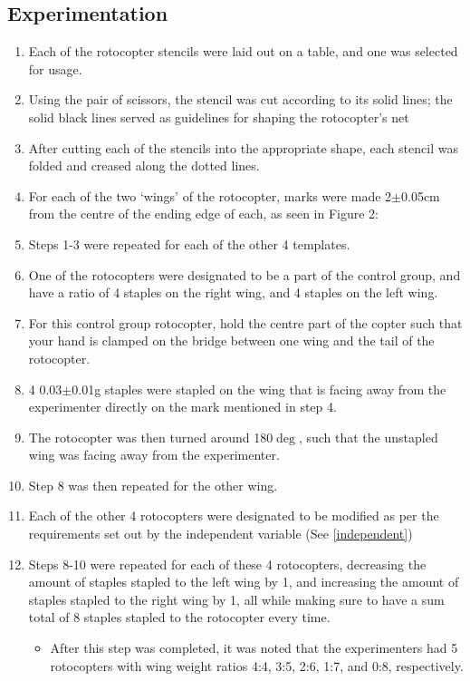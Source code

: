\documentclass[]{article}
\theoremstyle{definition}
\begin{document}
\subsection{Experimentation} \label{Experimentation}
\begin{enumerate}
    \item Each of the rotocopter stencils were laid out on a table, and one was selected for usage.
    \item Using the pair of scissors, the stencil was cut according to its solid lines; the solid black lines served as guidelines for shaping the rotocopter’s net
    \item After cutting each of the stencils into the appropriate shape, each stencil was folded and creased along the dotted lines.
    \item For each of the two ‘wings’ of the rotocopter, marks were made 2$\pm$0.05cm from the centre of the ending edge of each, as seen in Figure 2:
    \item Steps 1-3 were repeated for each of the other 4 templates.
    \item One of the rotocopters were designated to be a part of the control group, and have a ratio of 4 staples on the right wing, and 4 staples on the left wing.
    \item For this control group rotocopter, hold the centre part of the copter such that your hand is clamped on the bridge between one wing and the tail of the rotocopter.
    \item 4 0.03$\pm$0.01g staples were stapled on the wing that is facing away from the experimenter directly on the mark mentioned in step 4.
    \item The rotocopter was then turned around 180$\deg$, such that the unstapled wing was facing away from the experimenter.
    \item Step 8 was then repeated for the other wing.
    \item Each of the other 4 rotocopters were designated to be modified as per the requirements set out by the independent variable (See \ref{independent})
    \item Steps 8-10 were repeated for each of these 4 rotocopters, decreasing the amount of staples stapled to the left wing by 1, and increasing the amount of staples stapled to the right wing by 1, all while making sure to have a sum total of 8 staples stapled to the rotocopter every time.
    \begin{itemize}
        \item After this step was completed, it was noted that the experimenters had 5 rotocopters with wing weight ratios 4:4, 3:5, 2:6, 1:7, and 0:8, respectively.

\end{itemize}
\end{enumerate}
\end{document}
